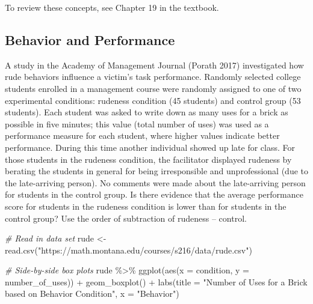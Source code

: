 \documentclass[
]{report}
\newenvironment{Shaded}{\begin{snugshade}}{\end{snugshade}}
\newcommand{\AttributeTok}[1]{\textcolor[rgb]{0.77,0.63,0.00}{#1}}
\newcommand{\CommentTok}[1]{\textcolor[rgb]{0.56,0.35,0.01}{\textit{#1}}}
\newcommand{\FunctionTok}[1]{\textcolor[rgb]{0.00,0.00,0.00}{#1}}
\newcommand{\NormalTok}[1]{#1}
\newcommand{\OtherTok}[1]{\textcolor[rgb]{0.56,0.35,0.01}{#1}}
\newcommand{\SpecialCharTok}[1]{\textcolor[rgb]{0.00,0.00,0.00}{#1}}
\newcommand{\StringTok}[1]{\textcolor[rgb]{0.31,0.60,0.02}{#1}}
\begin{document}
To review these concepts, see Chapter 19 in the textbook.

\hypertarget{behavior-and-performance}{%
\subsection{Behavior and Performance}\label{behavior-and-performance}}

A study in the Academy of Management Journal (Porath 2017) investigated how rude behaviors influence a victim's task performance. Randomly selected college students enrolled in a management course were randomly assigned to one of two experimental conditions: rudeness condition (45 students) and control group (53 students). Each student was asked to write down as many uses for a brick as possible in five minutes; this value (total number of uses) was used as a performance measure for each student, where higher values indicate better performance. During this time another individual showed up late for class. For those students in the rudeness condition, the facilitator displayed rudeness by berating the students in general for being irresponsible and unprofessional (due to the late-arriving person). No comments were made about the late-arriving person for students in the control group. Is there evidence that the average performance score for students in the rudeness condition is lower than for students in the control group? Use the order of subtraction of rudeness -- control.

\begin{Shaded}
\begin{Highlighting}[]
\CommentTok{\# Read in data set}
\NormalTok{rude }\OtherTok{\textless{}{-}} \FunctionTok{read.csv}\NormalTok{(}\StringTok{"https://math.montana.edu/courses/s216/data/rude.csv"}\NormalTok{)}
\end{Highlighting}
\end{Shaded}

\newpage

\begin{Shaded}
\begin{Highlighting}[]
\CommentTok{\# Side{-}by{-}side box plots}
\NormalTok{rude }\SpecialCharTok{\%\textgreater{}\%}
\FunctionTok{ggplot}\NormalTok{(}\FunctionTok{aes}\NormalTok{(}\AttributeTok{x =}\NormalTok{ condition, }\AttributeTok{y =}\NormalTok{ number\_of\_uses)) }\SpecialCharTok{+}
    \FunctionTok{geom\_boxplot}\NormalTok{() }\SpecialCharTok{+} 
    \FunctionTok{labs}\NormalTok{(}\AttributeTok{title =} \StringTok{"Number of Uses for a Brick based on Behavior Condition"}\NormalTok{,}
         \AttributeTok{x =} \StringTok{"Behavior"}\NormalTok{) }
\end{Highlighting}
\end{Shaded}
\end{document}
